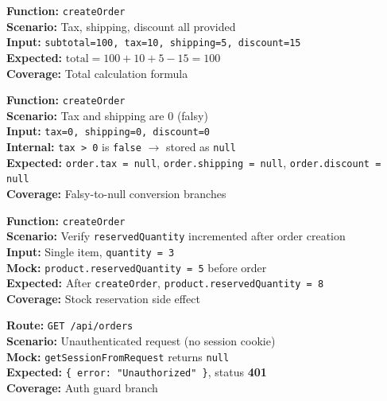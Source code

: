 \documentclass[12pt,a4paper]{report}
\newcommand{\pone}{\textbf{\color{p1red}P1}}
\newcommand{\ptwo}{\textbf{\color{p2orange}P2}}
\begin{document}
\begin{tcolorbox}[testbox, title={ORD-009 \hfill \pone}]
\textbf{Function:} \texttt{createOrder} \\
\textbf{Scenario:} Tax, shipping, discount all provided \\
\textbf{Input:} \texttt{subtotal=100, tax=10, shipping=5, discount=15} \\
\textbf{Expected:} $\text{total} = 100 + 10 + 5 - 15 = 100$ \\
\textbf{Coverage:} Total calculation formula
\end{tcolorbox}

\begin{tcolorbox}[testbox, title={ORD-010 \hfill \ptwo}]
\textbf{Function:} \texttt{createOrder} \\
\textbf{Scenario:} Tax and shipping are 0 (falsy) \\
\textbf{Input:} \texttt{tax=0, shipping=0, discount=0} \\
\textbf{Internal:} \texttt{tax > 0} is \texttt{false} $\to$ stored as \texttt{null} \\
\textbf{Expected:} \texttt{order.tax = null}, \texttt{order.shipping = null}, \texttt{order.discount = null} \\
\textbf{Coverage:} Falsy-to-null conversion branches
\end{tcolorbox}

\begin{tcolorbox}[testbox, title={ORD-011 \hfill \pone}]
\textbf{Function:} \texttt{createOrder} \\
\textbf{Scenario:} Verify \texttt{reservedQuantity} incremented after order creation \\
\textbf{Input:} Single item, \texttt{quantity = 3} \\
\textbf{Mock:} \texttt{product.reservedQuantity = 5} before order \\
\textbf{Expected:} After \texttt{createOrder}, \texttt{product.reservedQuantity = 8} \\
\textbf{Coverage:} Stock reservation side effect
\end{tcolorbox}

\begin{tcolorbox}[testbox, title={ORD-012 \hfill \pone}]
\textbf{Route:} \texttt{GET /api/orders} \\
\textbf{Scenario:} Unauthenticated request (no session cookie) \\
\textbf{Mock:} \texttt{getSessionFromRequest} returns \texttt{null} \\
\textbf{Expected:} \texttt{\{ error: "Unauthorized" \}}, status \textbf{401} \\
\textbf{Coverage:} Auth guard branch
\end{tcolorbox}
\end{document}
